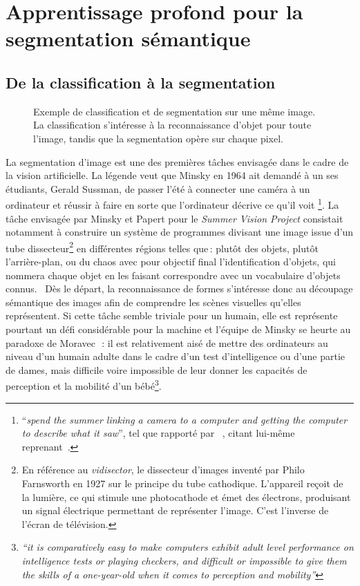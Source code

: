 \section{Apprentissage profond pour la segmentation sémantique}

\subsection{De la classification à la segmentation}

\begin{figure}[t]
  \resizebox{\textwidth}{!}{}
  \caption{Exemple de classification et de segmentation sur une même image. La classification s'intéresse à la reconnaissance d'objet pour toute l'image, tandis que la segmentation opère sur chaque pixel.}
  \label{fig:classif_vs_seg}
\end{figure}

La segmentation d'image est une des premières tâches envisagée dans le cadre de la vision artificielle.
La légende veut que Minsky en 1964 ait demandé à un ses étudiants, Gerald Sussman, de \og passer l'été à connecter une caméra à un ordinateur et réussir à faire en sorte que l'ordinateur décrive ce qu'il voit \fg\footnote{``\emph{spend the summer linking a camera to a computer and getting the computer to describe what it saw}'', tel que rapporté par ~\citet{szeliski_computer_2011}, citant lui-même~\citet{boden_mind_2008} reprenant~\citet{crevier_ai_1993}.}.
La tâche envisagée par Minsky et Papert pour le \emph{Summer Vision Project} consistait notamment à \og construire un système de programmes divisant une image issue d'un tube dissecteur\footnote{En référence au \emph{vidisector}, le dissecteur d'images inventé par Philo Farnsworth en 1927 sur le principe du tube cathodique. L'appareil reçoit de la lumière, ce qui stimule une photocathode et émet des électrons, produisant un signal électrique permettant de représenter l'image. C'est l'inverse de l'écran de télévision.} en différentes régions telles que\,: plutôt des objets, plutôt l'arrière-plan, ou du chaos\fg{} avec pour objectif final \og l'identification d'objets, qui nommera chaque objet en les faisant correspondre avec un vocabulaire d'objets connus.\fg{}~\cite{papert_summer_1966}
Dès le départ, la reconnaissance de formes s'intéresse donc au découpage sémantique des images afin de comprendre les scènes visuelles qu'elles représentent.
Si cette tâche semble triviale pour un humain, elle est représente pourtant un défi considérable pour la machine et l'équipe de Minsky se heurte au paradoxe de Moravec~\cite{moravec_mind_1988}\,: \og il est relativement aisé de mettre des ordinateurs au niveau d'un humain adulte dans le cadre d'un test d'intelligence ou d'une partie de dames, mais difficile voire impossible de leur donner les capacités de perception et la mobilité d'un bébé\fg{}\footnote{\emph{``it is comparatively easy to make computers exhibit adult level performance on intelligence tests or playing checkers, and difficult or impossible to give them the skills of a one-year-old when it comes to perception and mobility''}}.

